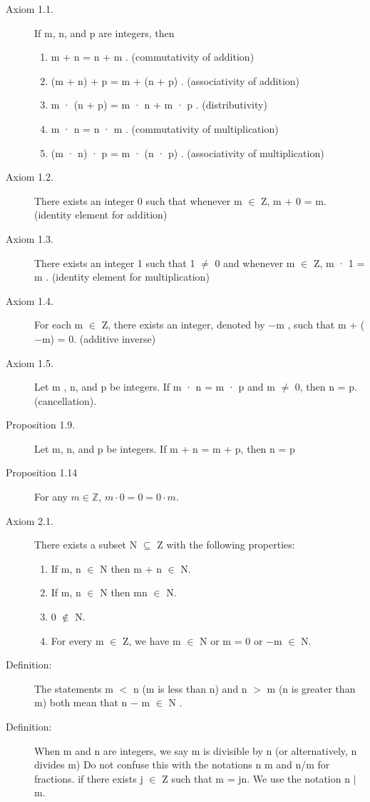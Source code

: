 \documentclass[12pt]{article}
\begin{document}
\begin{enumerate}
\begin{description}
\item[Axiom 1.1.] If m, n, and p are integers, then
\begin{enumerate}
\item m + n = n + m . (commutativity of addition)
\item  (m + n) + p = m + (n + p) . (associativity of addition)
\item  m · (n + p) = m · n + m · p . (distributivity)
\item m · n = n · m . (commutativity of multiplication)
\item  (m · n) · p = m · (n · p) . (associativity of multiplication)
\end{enumerate}
\item[Axiom 1.2.] There exists an integer 0 such that whenever m $\in$ Z, m + 0 = m.
(identity element for addition)
\item[Axiom 1.3.] There exists an integer 1 such that 1 $\neq$  0 and whenever m $\in$ Z, m · 1 = m .
(identity element for multiplication)
\item[Axiom 1.4.] For each m $\in$ Z, there exists an integer, denoted by $-$m , such that m +
($-$m) = 0. (additive inverse)
\item[Axiom 1.5.] Let m , n, and p be integers. If m · n = m · p and m $\neq$ 0, then n = p. (cancellation).
\item[Proposition 1.9.] Let m, n, and p be integers. If m + n = m + p, then n = p
\item[Proposition 1.14]  For any $m \in \mathbb Z$, $m \cdot 0 = 0 = 0\cdot m$.
\item[Axiom 2.1.] There exists a subset N $\subseteq$ Z with the following properties:
\begin{enumerate}
\item If m, n $\in$ N then m + n $\in$ N.
\item  If m, n $\in$  N then mn $\in$ N.
\item  0 $\not\in$ N.
\item  For every m $\in$ Z, we have m $\in$ N or m = 0 or $-$m $\in$ N.
\end{enumerate}
\item[Definition:]The statements m $<$ n (m is less than n) and n $>$ m (n is greater than
m) both mean that
n $-$ m $\in$ N .
\item[Definition:]  When m and n are integers, we say m is divisible by n (or alternatively, n divides m) Do not confuse this with the
notations n
m and n/m for
fractions.
if there exists j $\in$ Z such that m = jn. We use the notation n $|$ m.

\end{description}

\end{enumerate}
\end{document}
